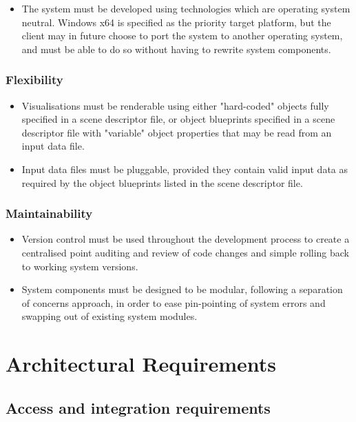 \documentclass[a4paper,12pt]{article}
\begin{document}
		\begin{itemize}
			\item The system must be developed using technologies which are operating system neutral. Windows x64 is specified as the priority target platform, but the client may in future choose to port the system to another operating system, and must be able to do so without having to rewrite system components.
		\end{itemize}
	
	\subsubsection{Flexibility}
	
		\begin{itemize}
			\item Visualisations must be renderable using either "hard-coded" objects fully specified in a scene descriptor file, or object blueprints specified in a scene descriptor file with "variable" object properties that may be read from an input data file.
			\item Input data files must be pluggable, provided they contain valid input data as required by the object blueprints listed in the scene descriptor file.
		\end{itemize}
		
	\subsubsection{Maintainability}
	
		\begin{itemize}
			\item Version control must be used throughout the development process to create a centralised point auditing and review of code changes and simple rolling back to working system versions.
			\item System components must be designed to be modular, following a separation of concerns approach, in order to ease pin-pointing of system errors and swapping out of existing system modules.
		\end{itemize}
\section{Architectural Requirements}	%

\subsection{Access and integration requirements}
\end{document}
